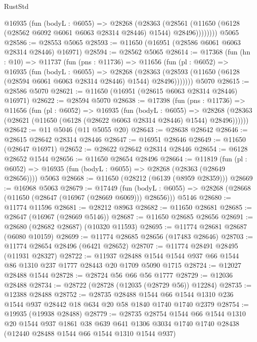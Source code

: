 \begin{lexlean}{RustStd}
\begin{coremodule}
          @16935
            (fun (bodyL : @6055) =>
            @28268
              (@28363
                (@28561
                  (@11650 (@6128 (@28562 @6092 @6061 @6063 @28314 @28446) @1544) @28496))))))))
    @5065
@28586 := @28553 @5065
@28593 := @11650 (@16951 (@28586 @6061 @6063 @28314 @28446) @16971)
@28594 := @28562 @5065
@28614 := @17368
    (fun (hn : @10) =>
    @11737
      (fun (pns : @11736) =>
      @11656
        (fun (pl : @6052) =>
        @16935
          (fun (bodyL : @6055) =>
          @28268
            (@28363 (@28593 (@11650 (@6128 (@28594 @6061 @6063 @28314 @28446) @1544) @28496)))))))
    @5070
@28615 := @28586 @5070
@28621 := @11650 (@16951 (@28615 @6063 @28314 @28446) @16971)
@28622 := @28594 @5070
@28638 := @17398
    (fun (pns : @11736) =>
    @11656
      (fun (pl : @6052) =>
      @16935
        (fun (bodyL : @6055) =>
        @28268 (@28363 (@28621 (@11650 (@6128 (@28622 @6063 @28314 @28446) @1544) @28496))))))
@28642 := @11 @5046 (@11 @5055 @20)
@28643 := @28638 @28642
@28646 := @28615 @28642 @28314 @28446
@28647 := @16951 @28646
@28649 := @11650 (@28647 @16971)
@28652 := @28622 @28642 @28314 @28446
@28654 := @6128 @28652 @1544
@28656 := @11650 @28654 @28496
@28664 := @11819
    (fun (pl : @6052) => @16935 (fun (bodyL : @6055) => @28268 (@28363 (@28649 @28656))))
    @5063
@28668 := @11650 (@28212 (@6139 (@8959 @28359)))
@28669 := @16968 @5063
@28679 := @17449
    (fun (bodyL : @6055) => @28268 (@28668 (@11650 (@28647 (@16967 (@28669 @6069))) @28656)))
    @5146
@28680 := @11774 @11596
@28681 := @28212 @8963
@28682 := @11650 @28681
@28685 := @28647 (@16967 (@28669 @5146))
@28687 := @11650 @28685 @28656
@28691 := @28680 (@28682 @28687) (@10320 @11593)
@28695 := @11774 @28681 @28687 (@6080 @10159)
@28699 := @11774 @28685 @28656 (@17483 @28646)
@28703 := @11774 @28654 @28496 (@6421 @28652)
@28707 := @11774 @28491 @28495 (@11931 @28327)
@28722 := @11937 @28488 @1544 @1544 @937 @66 @1544 @86 @1310 @237 @1777 @28443 @20 @1709 @5090 @1715
@28724 := @12027 @28488 @1544
@28728 := @28724 @56 @66 @56 @1777
@28729 := @12036 @28488
@28734 := @28722 (@28728 (@12035 (@28729 @56)) @12284)
@28735 := @12388 @28488
@28752 := @28735
    @28488
    @1544
    @66
    @1544
    @1310
    @236
    @1544
    @937
    @28442
    @18
    @634
    @20
    @58
    @1840
    @1740
    @1740
    @2379
@28754 := @19935 (@19938 @28488)
@28779 := @28735
    @28754
    @1544
    @66
    @1544
    @1310
    @20
    @1544
    @937
    @1861
    @38
    @639
    @641
    @1306
    @3034
    @1740
    @1740
    @28438
    (@12440 @28488 @1544 @66 @1544 @1310 @1544 @937)

\end{coremodule}
\end{lexlean}
